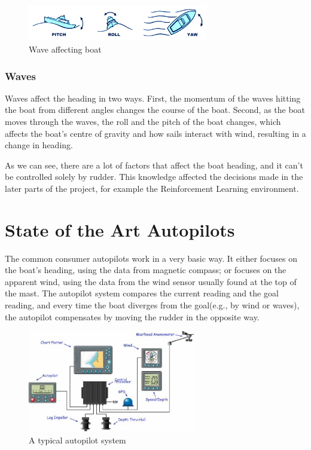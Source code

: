 \documentclass[12pt,twoside]{report}
\begin{document}
\begin{figure}[h]
\centering
\includegraphics[width = 0.7\textwidth]{figures/sailing/boat-pitch-roll-yaw.png}
\caption{Wave affecting boat \cite{img:pitch-roll-yaw}}
\label{fig:pitch-roll-yaw}
\end{figure}

\subsubsection{Waves}
Waves affect the heading in two ways. First, the momentum of the waves hitting the boat from different angles changes the course of the boat. Second, as the boat moves through the waves, the roll and the pitch of the boat changes, which affects the boat's centre of gravity and how sails interact with wind, resulting in a change in heading.

As we can see, there are a lot of factors that affect the boat heading, and it can't be controlled solely by rudder. This knowledge affected the decisions made in the later parts of the project, for example the Reinforcement Learning environment.


\section{State of the Art Autopilots}

The common consumer autopilots work in a very basic way. It either focuses on the boat's heading, using the data from magnetic compass; or focuses on the apparent wind, using the data from the wind sensor usually found at the top of the mast. The autopilot system compares the current reading and the goal reading, and every time the boat diverges from the goal(e.g., by wind or waves), the autopilot compensates by moving the rudder in the opposite way. 

\begin{figure}[h]
\centering
\includegraphics[width = 0.65\textwidth]{figures/other/autopilot.jpg}
\caption{A typical autopilot system \cite{img:autopilot}}
\label{fig:autopilot}
\end{figure}
\end{document}
